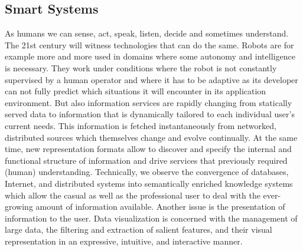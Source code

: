 \subsection{Smart Systems}
As humans we can sense, act, speak, listen, decide and sometimes
understand.  The 21st century will witness technologies that can do
the same. 
Robots are for example more and more used in domains where some autonomy and 
intelligence is necessary. They work under conditions where the robot is 
not constantly supervised by a human operator and where it has to be 
adaptive as its developer can not fully predict which situations it will 
encounter in its application environment. 
But also information services are rapidly changing from 
statically served data to information that is dynamically tailored to each individual user's
current needs. This information is fetched instantaneously from networked, distributed sources which
themselves change and evolve continually. At the same time, new representation formats
allow to discover and specify the internal and functional structure of information and
drive services that previously required (human) understanding. Technically, we observe the
convergence of databases, Internet, and distributed systems into semantically enriched
knowledge systems which allow the casual as well as the professional user to deal with the
ever-growing amount of information available.  
Another issue is the presentation of
information to the user.  Data visualization is concerned with the management of large
data, the filtering and extraction of salient features, and their visual representation in
an expressive, intuitive, and interactive manner.


